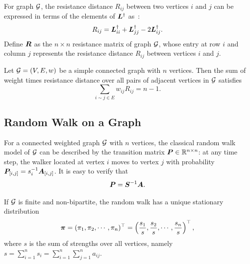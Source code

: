 \documentclass[journal]{IEEEtran}
\begin{document}
For graph \(\mathcal{G}\), the resistance distance \(R_{ij}\) between two vertices \(i\) and \(j\) can be expressed in terms of the elements of \(\boldsymbol{L}^{\dagger}\) as~\cite{KlRa93}:
\begin{equation}\label{EE04}
    R_{ij}={\boldsymbol{L}}_{ii}^{\dagger}+{\boldsymbol{L}}_{jj}^{\dagger}-2{\boldsymbol{L}}_{ij}^{\dagger}.
\end{equation}
Define \(\boldsymbol{R}\) as the \(n \times n\) resistance matrix of graph \(\mathcal{G}\), whose entry at row \(i\) and column \(j\) represents the resistance distance \(R_{ij}\) between vertices \(i\) and \(j\).

\begin{lemma}\label{Foster} \cite{Te91}
    Let \(\mathcal{G}=(V,E,w)\) be a simple connected graph with \(n\) vertices. Then the sum of  weight times resistance distance over all pairs of adjacent vertices in  \(\mathcal{G}\)  satisfies
    \begin{equation*}
        \sum_{ i\sim j\in E }w_{ij}R_{ij}=n-1.
    \end{equation*}
\end{lemma}

\subsection{Random Walk on a Graph}

For a connected weighted graph \(\mathcal{G}\) with \(n\) vertices, the classical random walk model of \(\mathcal{G}\) can be described by the transition matrix \(\boldsymbol{P}\in\mathbb{R}^{n\times n}\): at any time step, the walker located at vertex \(i\) moves to vertex \(j\) with probability \({\boldsymbol{P}_{[i,j]}=s_i^{-1}\boldsymbol{A}_{[i,j]}}\).
It is easy to verify that
\begin{equation}\label{eq:trs}
    \boldsymbol{P}=\boldsymbol{S}^{-1}\boldsymbol{A}.
\end{equation}

If  \(\mathcal{G}\) is  finite and non-bipartite, the random walk  has a unique stationary distribution~\cite{LiZh13PRE}
\begin{equation}\label{EE01}
    \boldsymbol{\pi}=(\pi_1, \pi_2, \cdots, \pi_n)^{\top}=\left(\frac{s_1}{s}, \frac{s_2}{s}, \cdots, \frac{s_n}{s}\right)^{\top},
\end{equation}
where \(s\) is the sum of strengths over all vertices, namely \(s=\sum_{i=1}^n s_i=\sum_{i=1}^{n}\sum_{j=1}^{n} a_{ij}\).
\end{document}
